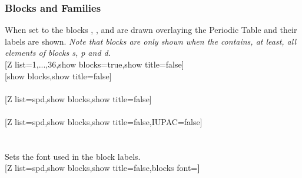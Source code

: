\vfill%
\subsubsection{\texorpdfstring{ Blocks and Families}{Blocks and Families}}\vspace{6pt}%
\label{option_show blocks}%
%
{When set to  the blocks , ,  and  are drawn overlaying the Periodic Table and their labels are shown. \textit{Note that blocks are only shown when the  contains, at least, all elements of blocks s, p and d}.}%
\\ [5pt][Z list={1,...,36},show blocks=true,show title=false]%
\\ [10pt]\makebox[\linewidth][c]{\scalebox{.6}{\pgfPT[Z list={1,...,36},show blocks=true,show title=false]}}%
\newpage%
[show blocks,show title=false]%
\\ [5pt]\makebox[\linewidth][c]{\scalebox{.6}{\pgfPT[show blocks,show title=false]}}%
\\ [5pt][Z list=spd,show blocks,show title=false]%
\\ [5pt]\makebox[\linewidth][c]{\scalebox{.6}{\pgfPT[Z list=spd,show blocks,show title=false]}}%
\\ [5pt][Z list=spd,show blocks,show title=false,IUPAC=false]%
\\ [5pt]\makebox[\linewidth][c]{\scalebox{.6}{\pgfPT[Z list=spd,show blocks,show title=false,IUPAC=false]}}%
\\ [0pt]\pgfPTendoption%
\newpage\enlargethispage{\baselineskip}\ \\ [-32pt]%
\label{option_blocks font}%
%
{Sets the font used in the block labels.}%
\\ [5pt][Z list=spd,show blocks,show title=false,blocks font=\string\small\string\bfseries\string{}\string\selectfont]%
\\ [10pt]\makebox[\linewidth][c]{\scalebox{.6}{\pgfPT[Z list=spd,show blocks,show title=false,blocks font=\small\bfseries\fontfamily{ptm}\selectfont]}}%
\\ [0pt]\pgfPTendoption%
\label{option_s block color}%
%
